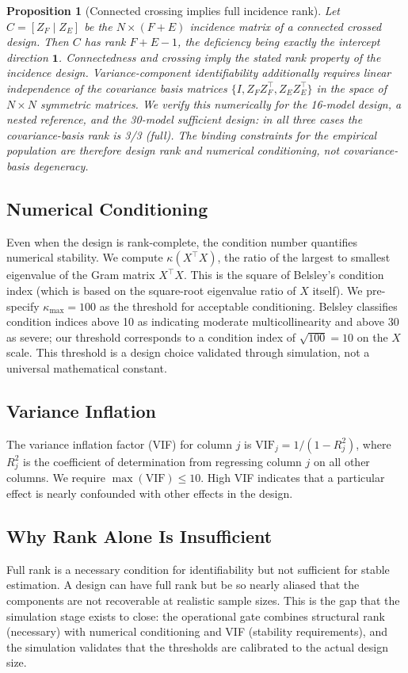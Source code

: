 \documentclass[11pt]{article}
\theoremstyle{definition}
\theoremstyle{plain}
\newtheorem{proposition}{Proposition}
\begin{document}
\begin{proposition}[Connected crossing implies full incidence rank]
\label{prop:rank}
Let $C = [Z_F \mid Z_E]$ be the $N \times (F + E)$ incidence matrix of a connected crossed design. Then $C$ has rank $F + E - 1$, the deficiency being exactly the intercept direction $\mathbf{1}$. Connectedness and crossing imply the stated rank property of the incidence design. Variance-component identifiability additionally requires linear independence of the covariance basis matrices $\{I, Z_F Z_F^\top, Z_E Z_E^\top\}$ in the space of $N \times N$ symmetric matrices. We verify this numerically for the 16-model design, a nested reference, and the 30-model sufficient design: in all three cases the covariance-basis rank is 3/3 (full). The binding constraints for the empirical population are therefore design rank and numerical conditioning, not covariance-basis degeneracy.
\end{proposition}

\subsection{Numerical Conditioning}
Even when the design is rank-complete, the condition number quantifies numerical stability. We compute $\kappa(X^\top X)$, the ratio of the largest to smallest eigenvalue of the Gram matrix $X^\top X$. This is the square of Belsley's condition index (which is based on the square-root eigenvalue ratio of $X$ itself). We pre-specify $\kappa_{\max} = 100$ as the threshold for acceptable conditioning. Belsley classifies condition indices above 10 as indicating moderate multicollinearity and above 30 as severe; our threshold corresponds to a condition index of $\sqrt{100} = 10$ on the $X$ scale. This threshold is a design choice validated through simulation, not a universal mathematical constant.

\subsection{Variance Inflation}
The variance inflation factor (VIF) for column $j$ is $\text{VIF}_j = 1/(1 - R^2_j)$, where $R^2_j$ is the coefficient of determination from regressing column $j$ on all other columns. We require $\max(\text{VIF}) \leq 10$. High VIF indicates that a particular effect is nearly confounded with other effects in the design.

\subsection{Why Rank Alone Is Insufficient}
Full rank is a necessary condition for identifiability but not sufficient for stable estimation. A design can have full rank but be so nearly aliased that the components are not recoverable at realistic sample sizes. This is the gap that the simulation stage exists to close: the operational gate combines structural rank (necessary) with numerical conditioning and VIF (stability requirements), and the simulation validates that the thresholds are calibrated to the actual design size.
\end{document}
